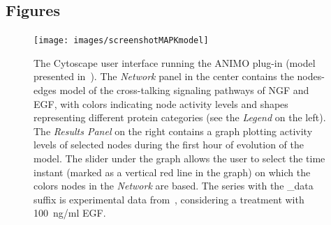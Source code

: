 \documentclass{bmcart}
\begin{document}
\begin{backmatter}
%












\clearpage
\section*{Figures}
% 




\begin{figure}[htbp]
\begin{center}
   \texttt{[image: images/screenshotMAPKmodel]}
\end{center}
\caption{The Cytoscape user interface running the ANIMO plug-in
(model presented in~\cite{animo-bibe}). The \emph{Network} panel in the center contains the nodes-edges
model of the cross-talking signaling pathways of NGF and EGF, with
colors indicating node activity levels and shapes representing different protein categories (see the \emph{Legend} on the left).
The \emph{Results Panel} on the right contains a graph plotting activity levels of selected nodes
during the first hour of evolution of the model. The slider under the graph
allows the user to select the time instant (marked as a vertical red line in the graph) on which
the colors nodes in the \emph{Network} are based.
The series with the {\sf \_data} suffix is experimental
data from~\cite{egf-ngf}, considering a treatment with 100~ng/ml EGF.
\label{fig:cytoscape}}
\end{figure}



\end{backmatter}
\end{document}
